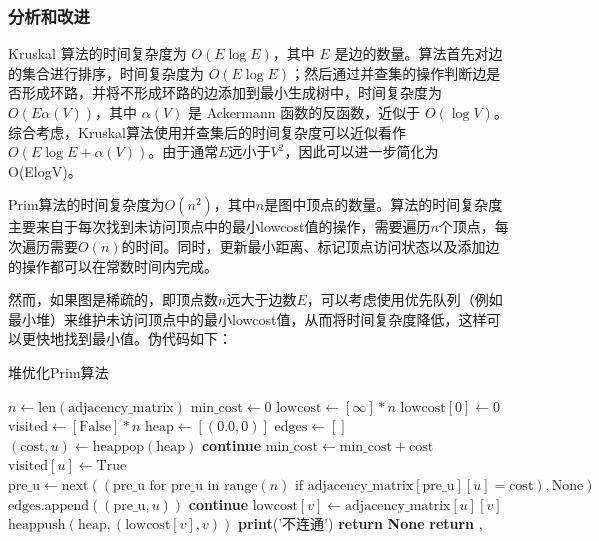 \documentclass[lang=cn,11pt,a4paper]{elegantpaper}
\begin{document}
\subsubsection{分析和改进}
Kruskal 算法的时间复杂度为 $O(E \log E)$，其中 $E$ 是边的数量。算法首先对边的集合进行排序，时间复杂度为 $O(E \log E)$；然后通过并查集的操作判断边是否形成环路，并将不形成环路的边添加到最小生成树中，时间复杂度为 $O(E \alpha(V))$，其中 $\alpha(V)$ 是 Ackermann 函数的反函数，近似于 $O(\log V)$。综合考虑，Kruskal算法使用并查集后的时间复杂度可以近似看作$O(E \log E + \alpha(V))$。由于通常$E$远小于$V^2$，因此可以进一步简化为O(ElogV)。


Prim算法的时间复杂度为$O(n^2)$，其中$n$是图中顶点的数量。算法的时间复杂度主要来自于每次找到未访问顶点中的最小lowcost值的操作，需要遍历$n$个顶点，每次遍历需要$O(n)$的时间。同时，更新最小距离、标记顶点访问状态以及添加边的操作都可以在常数时间内完成。

然而，如果图是稀疏的，即顶点数$n$远大于边数$E$，可以考虑使用优先队列（例如最小堆）来维护未访问顶点中的最小lowcost值，从而将时间复杂度降低，这样可以更快地找到最小值。伪代码如下：

\begin{algorithm}[H]
\caption{堆优化Prim算法}
\begin{algorithmic}[1]
    \State $n \gets \text{len}(\text{adjacency\_matrix})$
    \State $\text{min\_cost} \gets 0$
    \State $\text{lowcost} \gets [\infty] * n$
    \State $\text{lowcost}[0] \gets 0$
    \State $\text{visited} \gets [\text{False}] * n$
    \State $\text{heap} \gets [(0.0, 0)]$  
    \State $\text{edges} \gets []$  
        \State $(\text{cost}, u) \gets \text{heappop}(\text{heap})$
            \State \textbf{continue}
        \EndIf
        \State $\text{min\_cost} \gets \text{min\_cost} + \text{cost}$
        \State $\text{visited}[u] \gets \text{True}$
        \State $\text{pre\_u} \gets \text{next}((\text{pre\_u} \text{ for } \text{pre\_u} \text{ in range}(n) \text{ if } \text{adjacency\_matrix}[\text{pre\_u}][u] = \text{cost}), \text{None})$
        \State $\text{edges.append}((\text{pre\_u}, u))$
                \State \textbf{continue}
            \EndIf
                \State $\text{lowcost}[v] \gets \text{adjacency\_matrix}[u][v]$
                \State $\text{heappush}(\text{heap}, (\text{lowcost}[v], v))$
            \EndIf
        \EndFor
    \EndWhile
        \State \textbf{print}('不连通')
        \State \textbf{return} \textbf{None}
    \EndIf
    \State \textbf{return} , 
\EndFunction
\end{algorithmic}
\end{algorithm}
\end{document}
